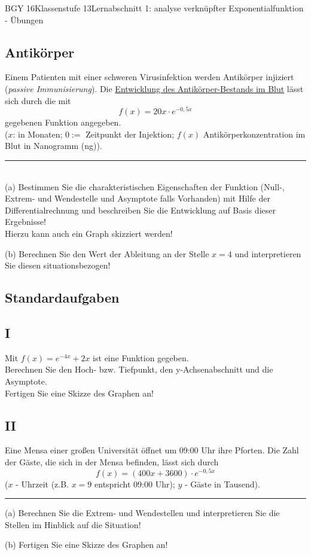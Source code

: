 \documentclass[oneside,openany,headings=optiontotoc,11pt,numbers=noenddot]{scrreprt}
\begin{document}
\begin{worksheet}{BGY 16}{Klassenstufe 13}{Lernabschnitt 1: analyse verknüpfter Exponentialfunktion - Übungen}
\begin{framed}
			\section*{Antikörper}
			Einem Patienten mit einer schweren Virusinfektion werden Antikörper injiziert (\textit{passive Immunisierung}). Die \underline{Entwicklung des Antikörper-Bestands im Blut} lässt sich durch die mit \[f(x) = 20x\cdot{}e^{-0,5x}\] gegebenen Funktion angegeben.\\
			(\(x\): in Monaten; \(0:=\) Zeitpunkt der Injektion; \(f(x)\) Antikörperkonzentration im Blut in Nanogramm (ng)).\\
			\par\noindent
			\rule{\textwidth}{0.1pt}\\
			(a) Bestimmen Sie die charakteristischen Eigenschaften der Funktion (Null-, Extrem- und Wendestelle und Asymptote falls Vorhanden) mit Hilfe der Differentialrechnung und beschreiben Sie die Entwicklung auf Basis dieser Ergebnisse!\\
			Hierzu kann auch ein Graph skizziert werden!\\
			\par\noindent
			(b) Berechnen Sie den Wert der Ableitung an der Stelle \(x=4\) und interpretieren Sie diesen situationsbezogen!
		\end{framed}
		\begin{framed}
			\section*{Standardaufgaben}
			\subsection{I}
			Mit \(f(x) = e^{-4x} + 2x\) ist eine Funktion gegeben.\\
			Berechnen Sie den Hoch- bzw. Tiefpunkt, den y-Achsenabschnitt und die Asymptote.\\
			Fertigen Sie eine Skizze des Graphen an!
			\subsection{II}
			Eine Mensa einer großen Universität öffnet um 09:00 Uhr ihre Pforten. Die Zahl der Gäste, die sich in der Mensa befinden, lässt sich durch \[f(x) = (400x + 3600)\cdot{}e^{-0,5x}\] (\(x\) - Uhrzeit (z.B. \(x = 9\) entspricht 09:00 Uhr); \(y\) - Gäste in Tausend).\\
			\par\noindent
			\rule{\textwidth}{0.1pt}
			(a) Berechnen Sie die Extrem- und Wendestellen und interpretieren Sie die Stellen im Hinblick auf die Situation!\\
			\par\noindent
			(b) Fertigen Sie eine Skizze des Graphen an!
		\end{framed}
	\end{worksheet}
\end{document}
